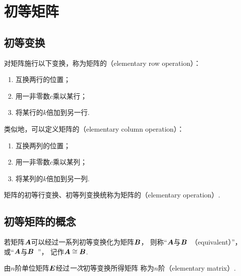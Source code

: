 \section{初等矩阵}
\subsection{初等变换}
对矩阵施行以下变换，称为矩阵的（elementary row operation）：
\begin{enumerate}
	\item 互换两行的位置；
	\item 用一非零数\(c\)乘以某行；
	\item 将某行的\(k\)倍加到另一行.
\end{enumerate}

类似地，可以定义矩阵的（elementary column operation）：
\begin{enumerate}
	\item 互换两列的位置；
	\item 用一非零数\(c\)乘以某列；
	\item 将某列的\(k\)倍加到另一列.
\end{enumerate}

矩阵的初等行变换、初等列变换统称为矩阵的（elementary operation）.


\subsection{初等矩阵的概念}
若矩阵\(\boldsymbol{A}\)可以经过一系列初等变换化为矩阵\(\boldsymbol{B}\)，
则称“\(\boldsymbol{A}\)与\(\boldsymbol{B}\)~（equivalent）”，
或“\(\boldsymbol{A}\)与\(\boldsymbol{B}\)~”，
记作\(\boldsymbol{A}\cong\boldsymbol{B}\).

\begin{definition}
由\(n\)阶单位矩阵\(\boldsymbol{E}\)经过\emph{一次}初等变换所得矩阵
称为\(n\)阶（elementary matrix）.
\end{definition}

